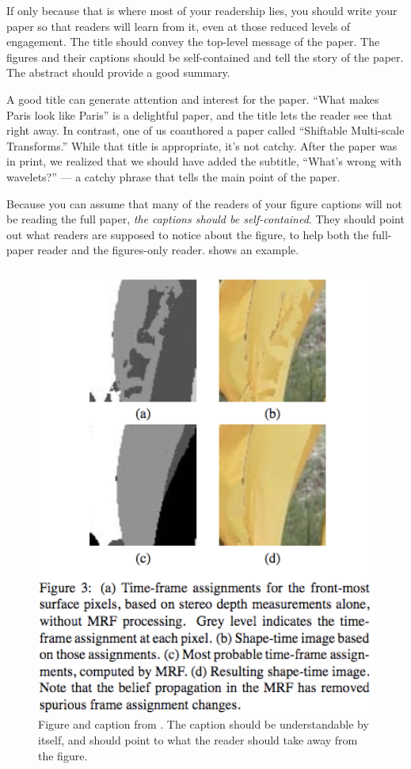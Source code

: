 If only because that is where most of your readership lies, you should write your paper so that readers will learn from it, even at those reduced levels of engagement.  The title should convey the top-level message of the paper.  The figures and their captions should be self-contained and tell the story of the paper.  The abstract should provide a good summary.

A good title can generate attention and interest for the paper.  ``What makes Paris look like Paris'' \cite{doersch2012what}
is a delightful paper, and the title lets the reader see that right away.  In contrast, one of us coauthored a paper called ``Shiftable Multi-scale Transforms.''  While that title is appropriate, it's not catchy.  After the paper was in print, we realized that we should have added the subtitle, ``What's wrong with wavelets?'' --- a catchy phrase that tells the main point of the paper.

Because you can assume that many of the readers of your figure captions will not be reading the full paper, {\em the captions should be self-contained}.  They should point out what readers are supposed to notice about the figure, to help both the full-paper reader and the figures-only reader. \Fig{\ref{fig:shapetime}} shows an example.

\begin{figure}
\centerline{
\includegraphics[width=0.55\linewidth]{figures/papers/shapetimeFig.jpg}}
\caption{Figure and caption from \cite{FreemanShapetime}. The caption should be understandable by itself, and should point to what the reader should take away from the figure. }
\label{fig:shapetime}
\end{figure}

